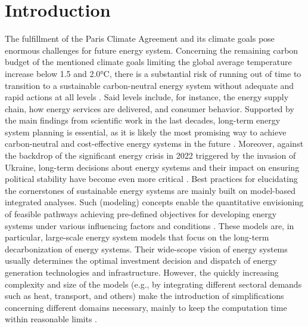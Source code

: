 \section{Introduction}
The fulfillment of the Paris Climate Agreement \cite{agreement2015paris} and its climate goals pose enormous challenges for future energy system. Concerning the remaining carbon budget of the mentioned climate goals limiting the global average temperature increase below 1.5 and 2.0°C, there is a substantial risk of running out of time to transition to a sustainable carbon-neutral energy system without adequate and rapid actions at all levels \cite{duan2020modeling}. Said levels include, for instance, the energy supply chain, how energy services are delivered, and consumer behavior. Supported by the main findings from scientific work in the last decades, long-term energy system planning is essential, as it is likely the most promising way to achieve carbon-neutral and cost-effective energy systems in the future \cite{auer2020development}. Moreover, against the backdrop of the significant energy crisis in 2022 triggered by the invasion of Ukraine, long-term decisions about energy systems and their impact on ensuring political stability have become even more critical \cite{papadis2020challenges}. Best practices for elucidating the cornerstones of sustainable energy systems are mainly built on model-based integrated analyses. Such (modeling) concepts enable the quantitative envisioning of feasible pathways achieving pre-defined objectives for developing energy systems under various influencing factors and conditions \cite{felder2021review}. These models are, in particular, large-scale energy system models that focus on the long-term decarbonization of energy systems. Their wide-scope vision of energy systems usually determines the optimal investment decision and dispatch of energy generation technologies and infrastructure. However, the quickly increasing complexity and size of the models (e.g., by integrating different sectoral demands such as heat, transport, and others) make the introduction of simplifications concerning different domains necessary, mainly to keep the computation time within reasonable limits \cite{kotzur2021modeler}.\vspace{0.5cm}

